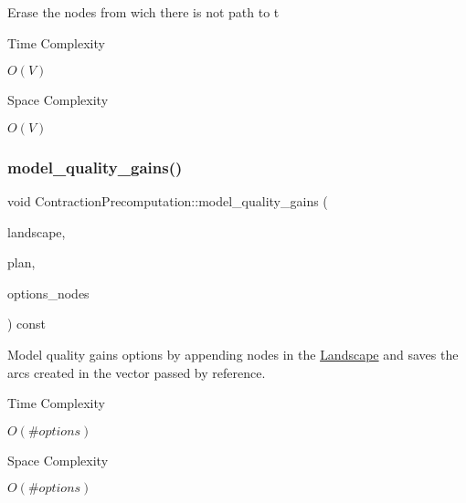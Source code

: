 Erase the nodes from wich there is not path to t

\begin{DoxyRefDesc}{Time Complexity}
\item[\hyperlink{time__time000001}{Time Complexity}]$O(V)$ \end{DoxyRefDesc}
\begin{DoxyRefDesc}{Space Complexity}
\item[\hyperlink{space__space000001}{Space Complexity}]$O(V)$ \end{DoxyRefDesc}
\mbox{\label{class_contraction_precomputation_a6ea4ee46a1805ced601de847969cab61}} 
\subsubsection{\texorpdfstring{model\+\_\+quality\+\_\+gains()}{model\_quality\_gains()}}
{\footnotesize\ttfamily void Contraction\+Precomputation\+::model\+\_\+quality\+\_\+gains (\begin{DoxyParamCaption}\item[{\hyperlink{class_landscape}{Landscape} \&}]{landscape,  }\item[{\hyperlink{class_restoration_plan}{Restoration\+Plan} \&}]{plan,  }\item[{std\+::vector$<$ std\+::vector$<$ Graph\+\_\+t\+::\+Arc $>$$>$ \&}]{options\+\_\+nodes }\end{DoxyParamCaption}) const}

Model quality gains options by appending nodes in the \hyperlink{class_landscape}{Landscape} and saves the arcs created in the vector passed by reference.

\begin{DoxyRefDesc}{Time Complexity}
\item[\hyperlink{time__time000003}{Time Complexity}]$O(\#options)$ \end{DoxyRefDesc}
\begin{DoxyRefDesc}{Space Complexity}
\item[\hyperlink{space__space000003}{Space Complexity}]$O(\#options)$ \end{DoxyRefDesc}
\mbox{\label{class_contraction_precomputation_a205ee98224bfa783a7ab27d3a986468b}} 
